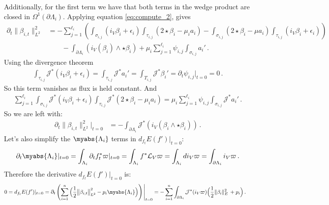 \documentclass[11pt]{article}
\theoremstyle{plain}
\theoremstyle{definition}
\theoremstyle{remark}
\newcommand{\ST}{\Lambda}
\begin{document}
Additionally, for the first term we have that both terms in the wedge product are closed in \( \Omega^1 (\partial \ST_i)\). Applying equation \eqref{eq:compute_2}, gives
\begin{align*}
    \partial_t    \big\| \beta_{i,t}\big\|_{L^2}^2  &= - \sum_{j=1}^{\ell_i}  \left(   \int_{\sigma_{i,j}} \! (i_V\beta_i + \epsilon_i )    \int_{\tau_{i,j}} \!  ( 2 \star\beta_i - \mu_i a_i) -\int_{\sigma_{i,j}} \!  ( 2 \star\beta_i - \mu a_i) \int_{\tau_{i,j}} \!  (i_V\beta_i + \epsilon_i ) \right) \\ & \qquad -
    \int_{\partial \ST_i}  (i_V( \beta_i) \wedge \star\beta_i)  + \mu_i \sum_{j=1}^{\ell_i} \psi_{i,j} \int_{\sigma_{i,j}}   a_i'  \, .
\end{align*}
Using the divergence theorem 
\begin{align*}
    \int_{\tau_{i,j}} \mathcal{J}^* (i_V \beta_i + \epsilon_i ) = \int_{\tau_{i,j}} \mathcal{J}^* a_i' =  \int_{T_{i,j}} \mathcal{J}^*\beta_i' = \partial_t \psi_{i,j} |_{t=0} = 0 \, .
\end{align*}
So this term vanishes as flux is held constant. And
\begin{align*}
    \sum_{j=1}^{\ell_i}    \int_{\sigma_{i,j}} \mathcal{J}^*(i_V\beta_i + \epsilon_i )    \int_{\tau_{i,j}} \mathcal{J}^*( 2 \star\beta_i - \mu_i a_i)  = 
    \mu_i \sum_{j=1}^{\ell_i}   \psi_{i,j}   \int_{\sigma_{i,j}} \mathcal{J}^* a_i'   \, .
\end{align*}
So we are left with:
\begin{align*}
     \partial_t    \big\| \beta_{i,t}\big\|_{L^2}^2    \Big|_{t=0} & =   -
    \int_{\partial \ST_i} \mathcal{J}^* (i_V( \beta_i \wedge \star\beta_i) )  \, .
\end{align*}
Let's also simplify the \( \myabs{ \ST_i } \) terms in \(d_{f_t} E(f') |_{t=0}\):
\begin{align*}
    \partial_t \myabs{ \ST_i } |_{t=0} = \int_{\ST_i} \partial_t f^*_t \varpi |_{t=0} 
    = \int_{\ST_i} f^* \mathcal{L}_V \varpi =  \int_{\ST_i} d i_V \varpi =  \int_{\partial \ST_i} i_V \varpi \, . 
\end{align*}
Therefore the derivative \(d_{f_t} E(f') |_{t=0}\) is:
\begin{align*}
    0 = d_{f_t} E(f') |_{t=0} &= \partial_t \left(   \sum_{i=1}^n \Big( \frac{1}{2} \big\| \beta_{i,t}\big\|_{L^2}^2 -  p_i \myabs{ \ST_i } \Big)      \right) \Bigg|_{t=0} 
    =  -  \sum_{i=1}^n   
    \int_{\partial \ST_i}  \mathcal{J}^* (i_V \varpi) \Big( \frac{1}{2}  \| \beta_i\|^2_E \,  +  p_i  \Big) \, .
\end{align*}
\end{document}
